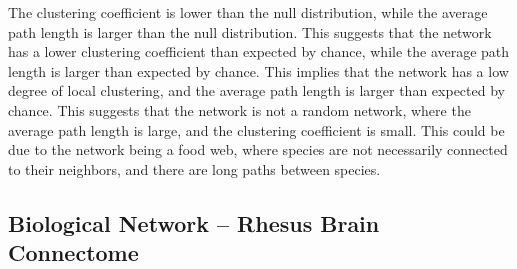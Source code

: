 \documentclass[12pt]{article}
\begin{document}
The clustering coefficient is lower than the null distribution, while the average path length is larger than the null distribution. This suggests that the network has a lower clustering coefficient than expected by chance, while the average path length is larger than expected by chance. This implies that the network has a low degree of local clustering, and the average path length is larger than expected by chance. This suggests that the network is not a random network, where the average path length is large, and the clustering coefficient is small. This could be due to the network being a food web, where species are not necessarily connected to their neighbors, and there are long paths between species.


\subsection*{Biological Network -- Rhesus Brain Connectome}
\end{document}
